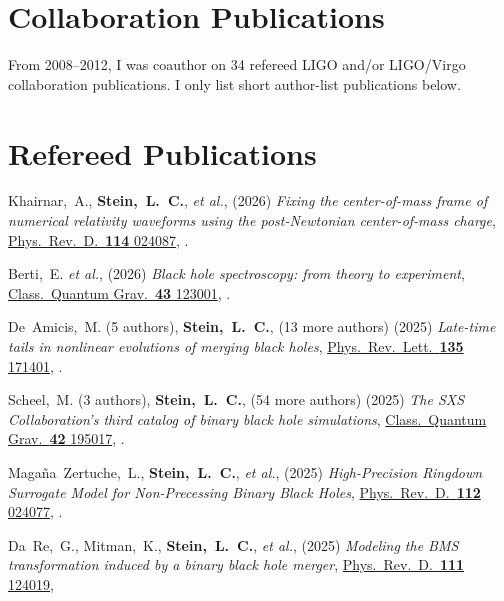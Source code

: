 \section{Collaboration Publications}
From 2008--2012, I was coauthor on 34 refereed LIGO and/or LIGO/Virgo
collaboration publications. I only list short author-list publications below.

\section{Refereed Publications}
\secstartswithlist{}%
\addtocounter{pubCounter}{-1}%
\begin{etaremune}[start=\value{pubCounter}]
\item
  Khairnar,~A.,
  {\bf Stein,~L.~C.},
  {\it et al.},
  (2026)
  {\it Fixing the center-of-mass frame of numerical relativity waveforms using the post-Newtonian center-of-mass charge},
  \href{https://doi.org/10.1103/w57c-gp1p}%
  {Phys.~Rev.~D.~{\bf 114} 024087},
  .
\item
  Berti,~E.
  {\it et al.},
  (2026)
  {\it Black hole spectroscopy: from theory to experiment},
  \href{https://doi.org/10.1088/1361-6382/ae59e2}%
  {Class.~Quantum Grav.~{\bf 43} 123001},
  .
\item
  De~Amicis,~M.
  (5 authors),
  {\bf Stein,~L.~C.},
  (13 more authors)
  (2025)
  {\it Late-time tails in nonlinear evolutions of merging black holes},
  \href{https://doi.org/10.1103/2brx-xnyr}%
  {Phys.~Rev.~Lett.~{\bf 135} 171401},
  .
\item
  Scheel,~M.
  (3 authors),
  {\bf Stein,~L.~C.},
  (54 more authors)
  (2025)
  {\it The SXS Collaboration's third catalog of binary black hole simulations},
  \href{https://doi.org/10.1088/1361-6382/adfd34}%
  {Class.~Quantum Grav.~{\bf 42} 195017},
  .
\item
  Magaña~Zertuche,~L.,
  {\bf Stein,~L.~C.},
  {\it et al.},
  (2025)
  {\it High-Precision Ringdown Surrogate Model for Non-Precessing Binary Black Holes},
  \href{https://doi.org/10.1103/q7sy-g3kl}%
  {Phys.~Rev.~D.~{\bf 112} 024077},
  .
\item
  Da~Re,~G.,
  Mitman,~K.,
  {\bf Stein,~L.~C.},
  {\it et al.},
  (2025)
  {\it Modeling the BMS transformation induced by a binary black hole merger},
  \href{https://doi.org/10.1103/PhysRevD.111.124019}%
  {Phys.~Rev.~D.~{\bf 111} 124019},

\end{etaremune}
